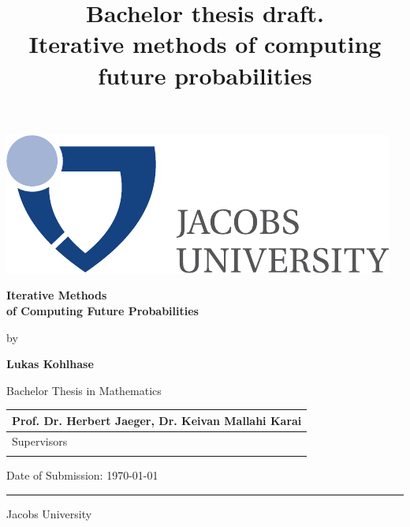 \documentclass{article}
\author{\givenname{Lukas} \surname{Kohlhase} \and \givenname{Herbert} \surname{Jaeger} \and \givenname{Keivan Mallahi} \surname{Karai}}
\title{Bachelor thesis draft. \\ Iterative methods of computing future probabilities}
\theoremstyle{definition}
\newcommand{\myname}{Lukas Kohlhase}
\newcommand{\mytitle}{Iterative Methods \\of Computing Future Probabilities}
\newcommand{\mysupervisor}{\bf{Prof. Dr. Herbert Jaeger, Dr. Keivan Mallahi Karai}}
\begin{document}
  \thispagestyle{empty}

  \begin{flushright}
   \includegraphics[scale=0.7]{bsc-logo}
  \end{flushright}
  \vspace{20mm}
  \begin{center}
    \huge
    \textbf{\mytitle}
  \end{center}
  \vspace*{4mm}
  \begin{center}
   \Large by
  \end{center}
  \vspace*{4mm}
  \begin{center}
    \Large
    \textbf{\myname}
  \end{center}
  \vspace*{20mm}
  \begin{center}
    \large
    Bachelor Thesis in Mathematics
  \end{center}
  \vfill
  \begin{flushright}
    \large
    \begin{tabular}{l}
      \mysupervisor \\
      \hline
      Supervisors \\
      \\
    \end{tabular}
  \end{flushright}
  \vspace*{8mm}
  \begin{flushleft}
    \large
    Date of Submission: \today \\
    \rule{\textwidth}{1pt}
  \end{flushleft}
  \begin{center}
    \Large Jacobs University
  \end{center}
\end{document}
